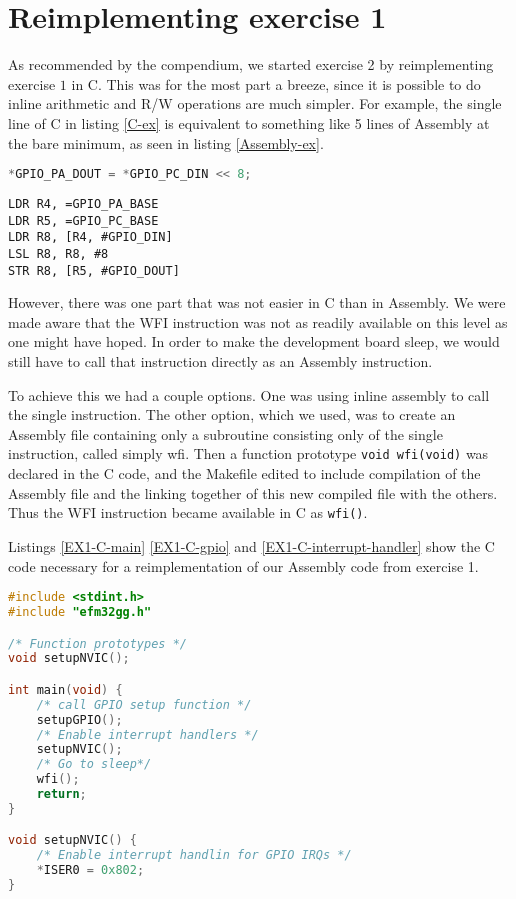 \section{Reimplementing exercise 1}

As recommended by the compendium, we started exercise 2 by reimplementing exercise $1$ in C. This was for the most part a breeze, since it is possible to do inline arithmetic and R/W operations are much simpler. For example, the single line of C in listing \ref{C-ex} is equivalent to something like 5 lines of Assembly at the bare minimum, as seen in listing \ref{Assembly-ex}.

\begin{lstlisting}[language=C,label=C-ex,caption=C]
*GPIO_PA_DOUT = *GPIO_PC_DIN << 8;
\end{lstlisting}

\begin{lstlisting}[label=Assembly-ex,caption=ASM]
LDR R4, =GPIO_PA_BASE
LDR R5, =GPIO_PC_BASE
LDR R8, [R4, #GPIO_DIN]
LSL R8, R8, #8
STR R8, [R5, #GPIO_DOUT]
\end{lstlisting}


However, there was one part that was not easier in C than in Assembly. We were made aware that the WFI instruction was not as readily available on this level as one might have hoped. In order to make the development board sleep, we would still have to call that instruction directly as an Assembly instruction.

To achieve this we had a couple options. One was using inline assembly to call the single instruction. The other option, which we used, was to create an Assembly file containing only a subroutine consisting only of the single instruction, called simply wfi. Then a function prototype \texttt{void wfi(void)} was declared in the C code, and the Makefile edited to include compilation of the Assembly file and the linking together of this new compiled file with the others. Thus the WFI instruction became available in C as \texttt{wfi()}.

Listings \ref{EX1-C-main} \ref{EX1-C-gpio} and \ref{EX1-C-interrupt-handler} show the C code necessary for a reimplementation of our Assembly code from exercise 1. 
\begin{lstlisting}[language=C, label=EX1-C-main, caption=main.c]
#include <stdint.h>
#include "efm32gg.h"

/* Function prototypes */
void setupNVIC();

int main(void) {
    /* call GPIO setup function */
    setupGPIO();
    /* Enable interrupt handlers */
    setupNVIC();
    /* Go to sleep*/
    wfi();
    return;
}

void setupNVIC() {
    /* Enable interrupt handlin for GPIO IRQs */
    *ISER0 = 0x802;
}
\end{lstlisting}

